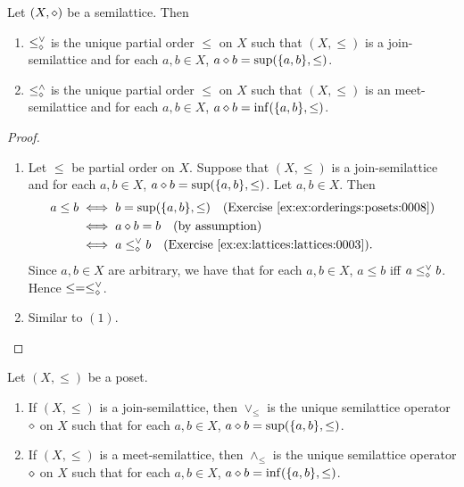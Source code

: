 \documentclass{book}
\begin{document}
	\begin{ex} 
		Let $(X, \diamond)$ be a semilattice. Then 
		\begin{enumerate}
			\item $\leq_{\diamond}^{\vee}$ is the unique partial order ${\leq}$ on $X$ such that $(X, \leq)$ is a join-semilattice and for each $a,b \in X$, $a \diamond b = \sup (\{a,b\}, \leq)$.
			\item $\leq_{\diamond}^{\wedge}$ is the unique partial order ${\leq}$ on $X$ such that $(X, \leq)$ is an meet-semilattice and for each $a,b \in X$, $a \diamond b = \inf (\{a,b\}, \leq)$.
		\end{enumerate}
	\end{ex}
	
	\begin{proof}\
		\begin{enumerate}
			\item Let $\leq$ be partial order on $X$. Suppose that $(X, \leq)$ is a join-semilattice and for each $a,b \in X$, $a \diamond b = \sup (\{a,b\}, \leq)$. Let $a,b \in X$. Then 
			\begin{align*}
				a \leq b
				& \iff b = \sup(\{a,b\}, \leq) \quad \text{(\rex{ex:orderings:posets:0008})} \\
				& \iff a \dmd b = b  \quad \text{(by assumption)} \\
				& \iff a \leq_{\dmd}^{\vee} b \quad \text{(\rex{ex:lattices:lattices:0003})}.
			\end{align*}
			Since $a,b \in X$ are arbitrary, we have that for each $a,b \in X$, $a \leq b$ iff $a \leq_{\diamond}^{\vee} b$. Hence $\leq = \leq_{\diamond}^{\vee}$. 
			\item Similar to $(1)$.
		\end{enumerate}
	\end{proof}
	
	\begin{ex} 
		Let $(X, \leq)$ be a poset. 
		\begin{enumerate}
			\item If $(X, \leq)$ is a join-semilattice, then $\vee_{\leq}$ is the unique semilattice operator $\diamond$ on $X$ such that for each $a,b \in X$, $a \diamond b = \sup (\{a,b\}, \leq)$.
			\item If $(X, \leq)$ is a meet-semilattice, then $\wedge_{\leq}$ is the unique semilattice operator $\diamond$ on $X$ such that for each $a,b \in X$, $a \diamond b = \inf (\{a,b\}, \leq)$.
		\end{enumerate}
	\end{ex}
	
\end{document}

